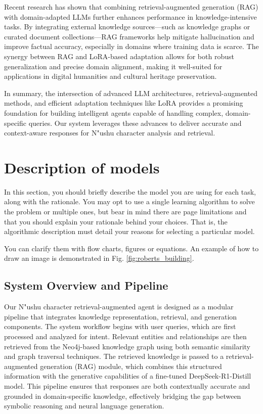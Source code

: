 \documentclass{article}
\begin{document}
    Recent research has shown that combining retrieval-augmented generation (RAG) with domain-adapted LLMs further enhances performance in knowledge-intensive tasks. By integrating external knowledge sources—such as knowledge graphs or curated document collections—RAG frameworks help mitigate hallucination and improve factual accuracy, especially in domains where training data is scarce. The synergy between RAG and LoRA-based adaptation allows for both robust generalization and precise domain alignment, making it well-suited for applications in digital humanities and cultural heritage preservation.

    In summary, the intersection of advanced LLM architectures, retrieval-augmented methods, and efficient adaptation techniques like LoRA provides a promising foundation for building intelligent agents capable of handling complex, domain-specific queries. Our system leverages these advances to deliver accurate and context-aware responses for N"{u}shu character analysis and retrieval.

\section{Description of models}
\label{sec:models}
    In this section, you should briefly describe the model you are using for each task, along with the rationale. You may opt to use a single learning algorithm to solve the problem or multiple ones, but bear in mind there are page limitations and that you should explain your rationale behind your choices. That is, the algorithmic description must detail your reasons for selecting a particular model.
    
    You can clarify them with flow charts, figures or equations. An example of how to draw an image is demonstrated in Fig. \ref{fig:roberts_building}.
    
\subsection{System Overview and Pipeline}
\label{ssec:system_overview}
    Our N"{u}shu character retrieval-augmented agent is designed as a modular pipeline that integrates knowledge representation, retrieval, and generation components. The system workflow begins with user queries, which are first processed and analyzed for intent. Relevant entities and relationships are then retrieved from the Neo4j-based knowledge graph using both semantic similarity and graph traversal techniques. The retrieved knowledge is passed to a retrieval-augmented generation (RAG) module, which combines this structured information with the generative capabilities of a fine-tuned DeepSeek-R1-Distill model. This pipeline ensures that responses are both contextually accurate and grounded in domain-specific knowledge, effectively bridging the gap between symbolic reasoning and neural language generation.
\end{document}
